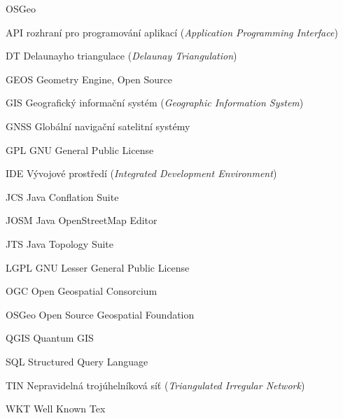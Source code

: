 

\begin{seznamzkratek}{OSGeo}

		{API}
		{rozhraní pro programování aplikací (\textit{Application Programming Interface})}

		{DT}
		{Delaunayho triangulace  (\textit{Delaunay Triangulation})}

	      {GEOS}
	      {Geometry Engine, Open Source}

	      {GIS}
 	      {Geografický informační systém  (\textit{Geographic Information System})}
	
	      {GNSS}
	      {Globální navigační satelitní systémy}

	      {GPL}
	      {GNU General Public License}

	      {IDE}
 	      {Vývojové prostředí (\textit{Integrated Development Environment})}

	      {JCS}
 	      {Java Conflation Suite}

	      {JOSM}
	      {Java OpenStreetMap Editor}

	      {JTS}
	      {Java Topology Suite}

	      {LGPL}
	      {GNU Lesser General Public License}

	      {OGC}
	      {Open Geospatial Consorcium}

	      {OSGeo}
	      {Open Source Geospatial Foundation}

	      {QGIS}
 	      {Quantum GIS}

	      {SQL}
	      {Structured Query Language}

	      {TIN}
 	      {Nepravidelná trojúhelníková síť  (\textit{Triangulated Irregular Network})}

	      {WKT}
 	      {Well Known Tex} %

\end{seznamzkratek}